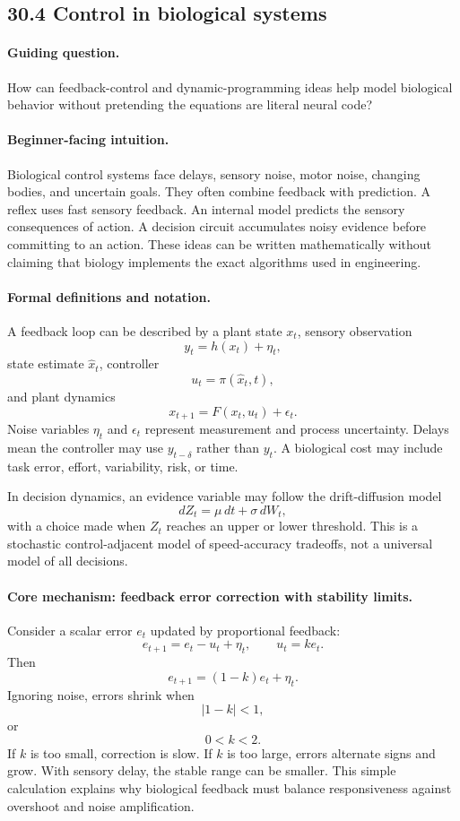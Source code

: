 \subsection{30.4 Control in biological systems}

\paragraph{Guiding question.}
How can feedback-control and dynamic-programming ideas help model biological behavior without pretending the equations are literal neural code?

\paragraph{Beginner-facing intuition.}
Biological control systems face delays, sensory noise, motor noise, changing bodies, and uncertain goals. They often combine feedback with prediction. A reflex uses fast sensory feedback. An internal model predicts the sensory consequences of action. A decision circuit accumulates noisy evidence before committing to an action. These ideas can be written mathematically without claiming that biology implements the exact algorithms used in engineering.

\paragraph{Formal definitions and notation.}
A feedback loop can be described by a plant state \(x_t\), sensory observation
\[
y_t=h(x_t)+\eta_t,
\]
state estimate \(\widehat x_t\), controller
\[
u_t=\pi(\widehat x_t,t),
\]
and plant dynamics
\[
x_{t+1}=F(x_t,u_t)+\epsilon_t.
\]
Noise variables \(\eta_t\) and \(\epsilon_t\) represent measurement and process uncertainty. Delays mean the controller may use \(y_{t-\delta}\) rather than \(y_t\). A biological cost may include task error, effort, variability, risk, or time.

In decision dynamics, an evidence variable may follow the drift-diffusion model
\[
dZ_t=\mu\,dt+\sigma\,dW_t,
\]
with a choice made when \(Z_t\) reaches an upper or lower threshold. This is a stochastic control-adjacent model of speed-accuracy tradeoffs, not a universal model of all decisions.

\paragraph{Core mechanism: feedback error correction with stability limits.}
Consider a scalar error \(e_t\) updated by proportional feedback:
\[
e_{t+1}=e_t-u_t+\eta_t,\qquad u_t=ke_t.
\]
Then
\[
e_{t+1}=(1-k)e_t+\eta_t.
\]
Ignoring noise, errors shrink when
\[
|1-k|<1,
\]
or
\[
0<k<2.
\]
If \(k\) is too small, correction is slow. If \(k\) is too large, errors alternate signs and grow. With sensory delay, the stable range can be smaller. This simple calculation explains why biological feedback must balance responsiveness against overshoot and noise amplification.

